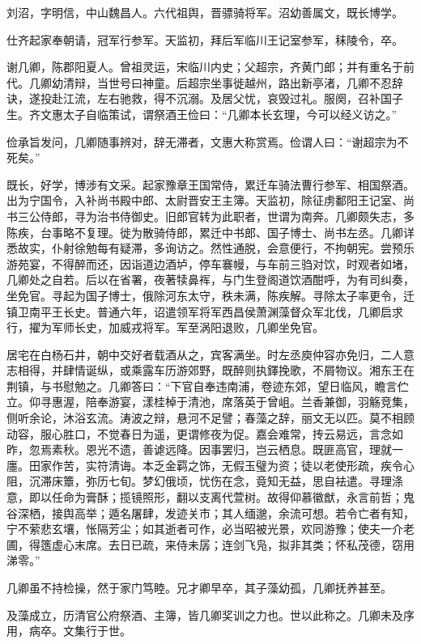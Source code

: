 \documentclass[12pt,UTF8]{ctexbook}
\begin{document}
刘沼，字明信，中山魏昌人。六代祖舆，晋骠骑将军。沼幼善属文，既长博学。

仕齐起家奉朝请，冠军行参军。天监初，拜后军临川王记室参军，秣陵令，卒。

谢几卿，陈郡阳夏人。曾祖灵运，宋临川内史；父超宗，齐黄门郎；并有重名于前代。几卿幼清辩，当世号曰神童。后超宗坐事徙越州，路出新亭渚，几卿不忍辞诀，遂投赴江流，左右驰救，得不沉溺。及居父忧，哀毁过礼。服阕，召补国子生。齐文惠太子自临策试，谓祭酒王俭曰：“几卿本长玄理，今可以经义访之。”

俭承旨发问，几卿随事辨对，辞无滞者，文惠大称赏焉。俭谓人曰：“谢超宗为不死矣。”

既长，好学，博涉有文采。起家豫章王国常侍，累迁车骑法曹行参军、相国祭酒。出为宁国令，入补尚书殿中郎、太尉晋安王主簿。天监初，除征虏鄱阳王记室、尚书三公侍郎，寻为治书侍御史。旧郎官转为此职者，世谓为南奔。几卿颇失志，多陈疾，台事略不复理。徙为散骑侍郎，累迁中书郎、国子博士、尚书左丞。几卿详悉故实，仆射徐勉每有疑滞，多询访之。然性通脱，会意便行，不拘朝宪。尝预乐游苑宴，不得醉而还，因诣道边酒垆，停车褰幔，与车前三驺对饮，时观者如堵，几卿处之自若。后以在省署，夜著犊鼻裈，与门生登阁道饮酒酣呼，为有司纠奏，坐免官。寻起为国子博士，俄除河东太守，秩未满，陈疾解。寻除太子率更令，迁镇卫南平王长史。普通六年，诏遣领军将军西昌侯萧渊藻督众军北伐，几卿启求行，擢为军师长史，加威戎将军。军至涡阳退败，几卿坐免官。

居宅在白杨石井，朝中交好者载酒从之，宾客满坐。时左丞庾仲容亦免归，二人意志相得，并肆情诞纵，或乘露车历游郊野，既醉则执鐸挽歌，不屑物议。湘东王在荆镇，与书慰勉之。几卿答曰：“下官自奉违南浦，卷迹东郊，望日临风，瞻言伫立。仰寻惠渥，陪奉游宴，漾桂棹于清池，席落英于曾岨。兰香兼御，羽觞竞集，侧听余论，沐浴玄流。涛波之辩，悬河不足譬；春藻之辞，丽文无以匹。莫不相顾动容，服心胜口，不觉春日为遥，更谓修夜为促。嘉会难常，抟云易远，言念如昨，忽焉素秋。恩光不遗，善谑远降。因事罢归，岂云栖息。既匪高官，理就一廛。田家作苦，实符清诲。本乏金羁之饰，无假玉璧为资；徒以老使形疏，疾令心阻，沉滞床簟，弥历七旬。梦幻俄顷，忧伤在念，竟知无益，思自袪遣。寻理涤意，即以任命为膏酥；揽镜照形，翻以支离代萱树。故得仰慕徽猷，永言前哲；鬼谷深栖，接舆高举；遁名屠肆，发迹关市；其人缅邈，余流可想。若令亡者有知，宁不萦悲玄壤，怅隔芳尘；如其逝者可作，必当昭被光景，欢同游豫；使夫一介老圃，得簉虚心末席。去日已疏，来侍未孱；连剑飞凫，拟非其类；怀私茂德，窃用涕零。”

几卿虽不持检操，然于家门笃睦。兄才卿早卒，其子藻幼孤，几卿抚养甚至。

及藻成立，历清官公府祭酒、主簿，皆几卿奖训之力也。世以此称之。几卿未及序用，病卒。文集行于世。
\end{document}
